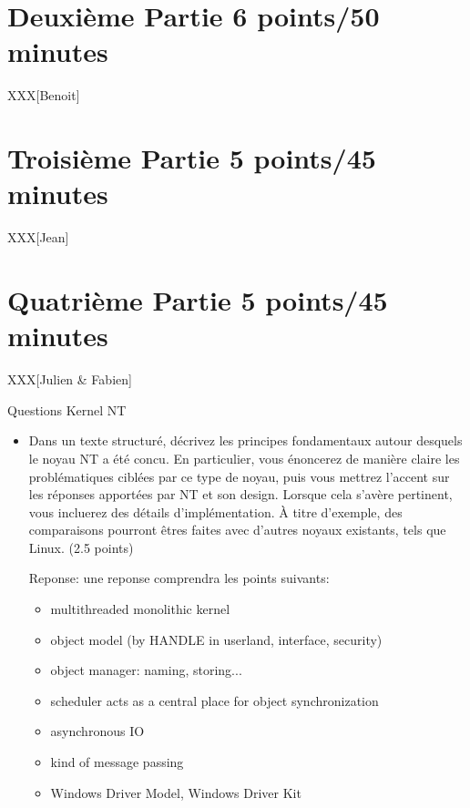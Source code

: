 \section{Deuxi\`eme Partie \hfill{} \scriptsize{6 points/50 minutes}}

XXX[Benoit]

%
%

\section{Troisi\`eme Partie \hfill{} \scriptsize{5 points/45 minutes}}

XXX[Jean]

%
%

\section{Quatri\`eme Partie \hfill{} \scriptsize{5 points/45 minutes}}

XXX[Julien \& Fabien]

Questions Kernel NT

\begin{itemize}
  \item Dans un texte structur\'{e}, d\'{e}crivez les principes fondamentaux autour
  desquels le noyau NT a \'{e}t\'{e} concu. En particulier, vous \'{e}noncerez de
  mani\`{e}re claire les probl\'{e}matiques cibl\'{e}es par ce type de noyau, puis
  vous mettrez l'accent sur les r\'{e}ponses apport\'{e}es par NT et son design.
  Lorsque cela s'av\`{e}re pertinent, vous incluerez des d\'{e}tails d'impl\'{e}mentation.
  \`{A} titre d'exemple, des comparaisons pourront \^{e}tres faites avec d'autres noyaux
  existants, tels que Linux. (2.5 points)

Reponse: une reponse comprendra les points suivants:
    \begin{itemize}
      \item multithreaded monolithic kernel
      \item object model (by HANDLE in userland, interface, security)
      \item object manager: naming, storing...
      \item scheduler acts as a central place for object synchronization
      \item asynchronous IO
      \item kind of message passing
      \item Windows Driver Model, Windows Driver Kit
    \end{itemize}

\end{itemize}


